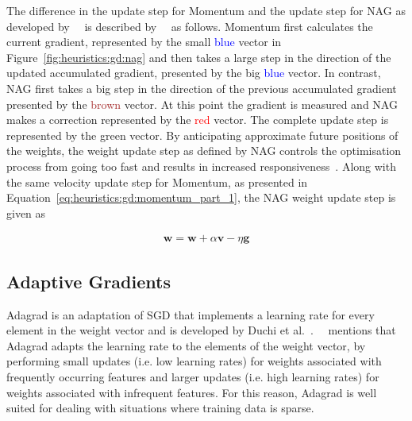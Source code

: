 The difference in the update step for \acs{Momentum} and the update step for \acs{NAG} as developed by~\citeauthor{ref:sutskever:2013-2}~\cite{ref:sutskever:2013-2} is described by~\citeauthor{ref:ruder:2016}~\cite{ref:ruder:2016} as follows. \acs{Momentum} first calculates the current gradient, represented by the small \textcolor{blue}{blue} vector in Figure~\ref{fig:heuristics:gd:nag} and then takes a large step in the direction of the updated accumulated gradient, presented by the big \textcolor{blue}{blue} vector. In contrast, \acs{NAG} first takes a big step in the direction of the previous accumulated gradient presented by the \textcolor{brown}{brown} vector. At this point the gradient is measured and \acs{NAG} makes a correction represented by the \textcolor{red}{red} vector. The complete update step is represented by the green vector. By anticipating approximate future positions of the weights, the weight update step as defined by \acs{NAG} controls the optimisation process from going too fast and results in increased responsiveness~\cite{ref:bengio:2013}. Along with the same velocity update step for \acs{Momentum}, as presented in Equation~\eqref{eq:heuristics:gd:momentum_part_1}, the \acs{NAG} weight update step is given as

\begin{equation}
      \label{eq:heuristics:gd:nag_part_2}
      \begin{split}
            \boldsymbol{w} = \boldsymbol{w} + \alpha \boldsymbol{v} - \eta \boldsymbol{g}
      \end{split}
\end{equation}


\subsection{Adaptive Gradients}\label{sec:heuristics:adagrad}

\Acf{Adagrad} is an adaptation of \acs{SGD} that implements a learning rate for every element in the weight vector and is developed by Duchi et al.~\cite{ref:duchi:2011}.~\citeauthor{ref:ruder:2016}~\cite{ref:ruder:2016} mentions that \acs{Adagrad} adapts the learning rate to the elements of the weight vector, by  performing small updates (i.e. low learning rates) for weights associated with frequently occurring features and larger updates (i.e. high learning rates) for weights associated with infrequent features. For this reason, \acs{Adagrad} is well suited for dealing with situations where training data is sparse.

